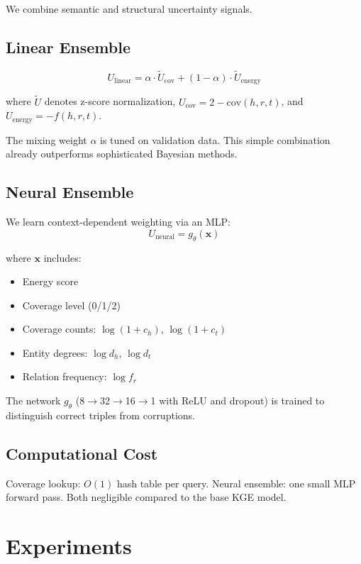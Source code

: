 \documentclass{article}
\begin{document}
We combine semantic and structural uncertainty signals.

\subsection{Linear Ensemble}

\[
U_{\text{linear}} = \alpha \cdot \tilde{U}_{\text{cov}} + (1-\alpha) \cdot \tilde{U}_{\text{energy}}
\]

where $\tilde{U}$ denotes z-score normalization, $U_{\text{cov}} = 2 - \text{cov}(h,r,t)$, and $U_{\text{energy}} = -f(h,r,t)$.

The mixing weight $\alpha$ is tuned on validation data.
This simple combination already outperforms sophisticated Bayesian methods.

\subsection{Neural Ensemble}

We learn context-dependent weighting via an MLP:
\[
U_{\text{neural}} = g_\theta(\mathbf{x})
\]

where $\mathbf{x}$ includes:
\begin{itemize}
    \item Energy score
    \item Coverage level (0/1/2)
    \item Coverage counts: $\log(1 + c_h)$, $\log(1 + c_t)$
    \item Entity degrees: $\log d_h$, $\log d_t$
    \item Relation frequency: $\log f_r$
\end{itemize}

The network $g_\theta$ (8$\to$32$\to$16$\to$1 with ReLU and dropout) is trained to distinguish correct triples from corruptions.

\subsection{Computational Cost}

Coverage lookup: $O(1)$ hash table per query.
Neural ensemble: one small MLP forward pass.
Both negligible compared to the base KGE model.

\section{Experiments}
\label{sec:experiments}
\end{document}

